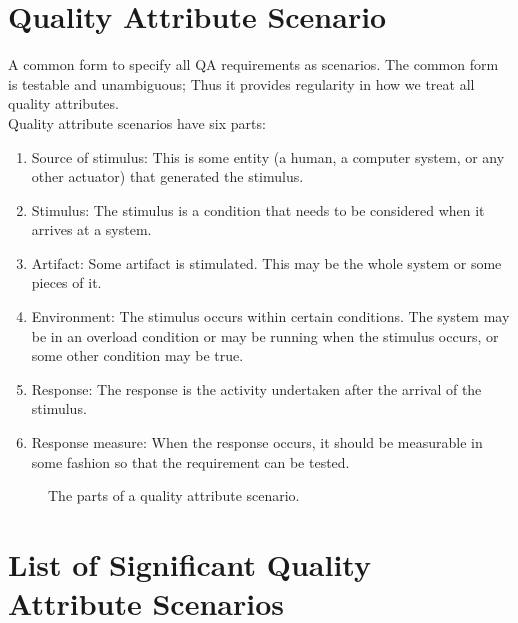 \section{Quality Attribute Scenario\label{Section::QAScenarios}}
A common form to specify all QA requirements as scenarios. The common form is testable and unambiguous; Thus it provides regularity in how we treat all quality attributes.
\\
Quality attribute scenarios have six parts:
\begin{enumerate}
    \item Source of stimulus: This is some entity (a human, a computer system, or any other actuator) that generated the stimulus.
    \item Stimulus: The stimulus is a condition that needs to be considered when it arrives at a system.
    \item Artifact: Some artifact is stimulated. This may be the whole system or some pieces of it.
    \item Environment: The stimulus occurs within certain conditions. The system may be in an overload condition or may be running when the stimulus occurs, or some other condition may be true.
    \item Response: The response is the activity undertaken after the arrival of the stimulus.
    \item Response measure: When the response occurs, it should be measurable in some fashion so that the requirement can be tested.
\end{enumerate}
\begin{figure}
\centering
{}
\caption{\label{Figure::The parts of a quality attribute scenario} The parts of a quality attribute scenario.}
\end{figure}
\section{List of Significant Quality Attribute Scenarios\label{Section::SignificantQAS}}
